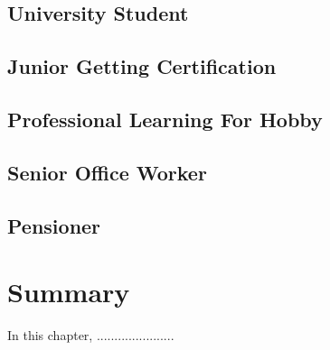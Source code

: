 \subsection{University Student}

\subsection{Junior Getting Certification}

\subsection{Professional Learning For Hobby}

\subsection{Senior Office Worker}

\subsection{Pensioner}


\section{Summary}
In this chapter, ......................
